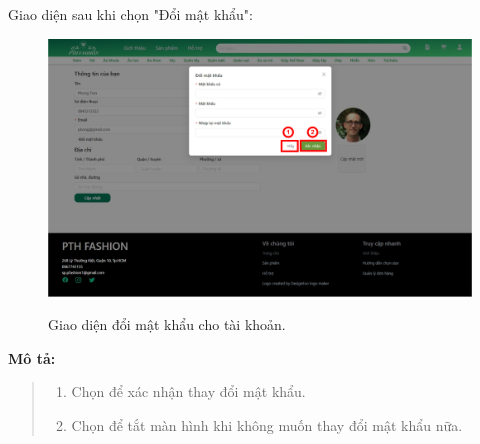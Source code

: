     \newpage
 
    Giao diện sau khi chọn "Đổi mật khẩu":
    \begin{figure}[!htp]
        \centering
        \includegraphics[width=5in]{img/UI/new_customer/change_password.png}
        \label{16}
        \newline
        \caption{Giao diện đổi mật khẩu cho tài khoản.}
    \end{figure}
 
    \textbf{Mô tả:}  
    \begin{quote}
        \begin{enumerate}
            \item Chọn để xác nhận thay đổi mật khẩu.
            \item Chọn để tắt màn hình khi không muốn thay đổi mật khẩu nữa.
        \end{enumerate}
    \end{quote}  
   
